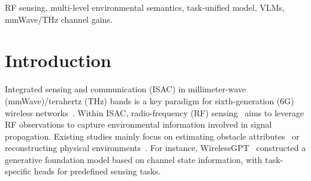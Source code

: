 \documentclass[journal,12pt,onecolumn,draftclsnofoot]{IEEEtran}
\begin{document}
\begin{abstract}
This letter investigates a task-unified multi-level radio-frequency (RF) sensing framework driven by vision–language models (VLMs). Existing RF sensing methods rely on task-specific designs and provide only partial environmental information, limiting their ability to handle emerging 6G applications. To address this, we formulate the RF sensing problem as a captioning task, mapping millimeter-wave (mmWave)/terahertz (THz) channel gains to captions describing multi-level environmental semantics. The framework solves this problem by fine-tuning a VLM, leveraging its knowledge-rich multimodal representations and prompt-conditioned semantic generation capabilities. Hence, different sensing tasks are specified through textual prompts, enabling the framework to handle diverse tasks in a unified manner. For fine-tuning, we introduce prompt-routed low-rank adaptation (LoRA) experts to achieve level-aware adaptation, thereby mitigating the discrepancy between propagation characteristics and visual–textual priors. Simulation results show that the proposed framework achieves up to 0.31 improvement in F1 score over the baselines, indicating better sensing performance in terms of precision and recall.



\end{abstract}

\begin{IEEEkeywords}
RF sensing, multi-level environmental semantics, task-unified model, VLMs, mmWave/THz channel gains.
\end{IEEEkeywords}

\section{Introduction}
\label{sec:intro}


Integrated sensing and communication (ISAC) in millimeter-wave (mmWave)/terahertz (THz) bands is a key paradigm for sixth-generation (6G) wireless networks~\cite{10494372}. Within ISAC, radio-frequency (RF) sensing~\cite{10907867} aims to leverage RF observations to capture environmental information involved in signal propagation. Existing studies mainly focus on estimating obstacle attributes~\cite{11278185,9448728} or reconstructing physical environments~\cite{hu2025advancing,11278185}. For instance, WirelessGPT~\cite{11278185} constructed a generative foundation model based on channel state information, with task-specific heads for predefined sensing tasks. 
\end{document}
